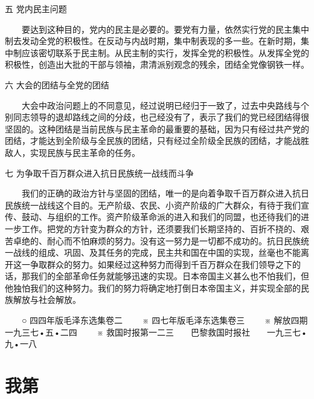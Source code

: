 \documentclass[twocolumn]{cvertbook}
\begin{document}
五 党内民主问题

　　要达到这种目的，党内的民主是必要的。要党有力量，依然实行党的民主集中制去发动全党的积极性。在反动与内战时期，集中制表现的多一些。在新时期，集中制应该密切联系于民主制。从民主制的实行，发挥全党的积极性。从发挥全党的积极性，创造出大批的干部与领袖，肃清派别观念的残余，团结全党像钢铁一样。

六 大会的团结与全党的团结

　　大会中政治问题上的不同意见，经过说明已经归于一致了，过去中央路线与个别同志领导的退却路线之间的分歧，也己经没有了，表示了我们的党已经团结得很坚固的。这种团结是当前民族与民主革命的最重要的基础，因为只有经过共产党的团结，才能达到全阶级与全民族的团结，只有经过全阶级全民族的团结，才能战胜敌人，实现民族与民主革命的任务。

七 为争取千百万群众进入抗日民族统一战线而斗争

　　我们的正确的政治方针与坚固的团结，唯一的是向着争取千百万群众进入抗日民族统一战线这个目的。无产阶级、农民、小资产阶级的广大群众，有待于我们宣传、鼓动、与组织的工作。资产阶级革命派的进入和我们的同盟，也还待我们的进一步工作。把党的方针变为群众的方针，还须要我们长期坚持的、百折不挠的、艰苦卓绝的、耐心而不怕麻烦的努力。没有这一努力是一切都不成功的。抗日民族统一战线的组成、巩固、及其任务的完成，民主共和国在中国的实现，丝毫也不能离开这一争取群众的努力。如果经过这种努力而得到千百万群众在我们领导之下的话，那我们的全部革命任务就能够迅速的实现。日本帝国主义甚么也不怕我们，但他独怕我们的这种努力。我们的努力将确定地打倒日本帝国主义，并实现全部的民族解放与社会解放。


　　○ 四四年版毛泽东选集卷二
　　※ 四七年版毛泽东选集卷三
　　※ 解放四期　　一九三七•五•二四
　　※ 救国时报第一二三　　巴黎救国时报社　　一九三七•九•一八　



\part{我第  }
\end{document}
